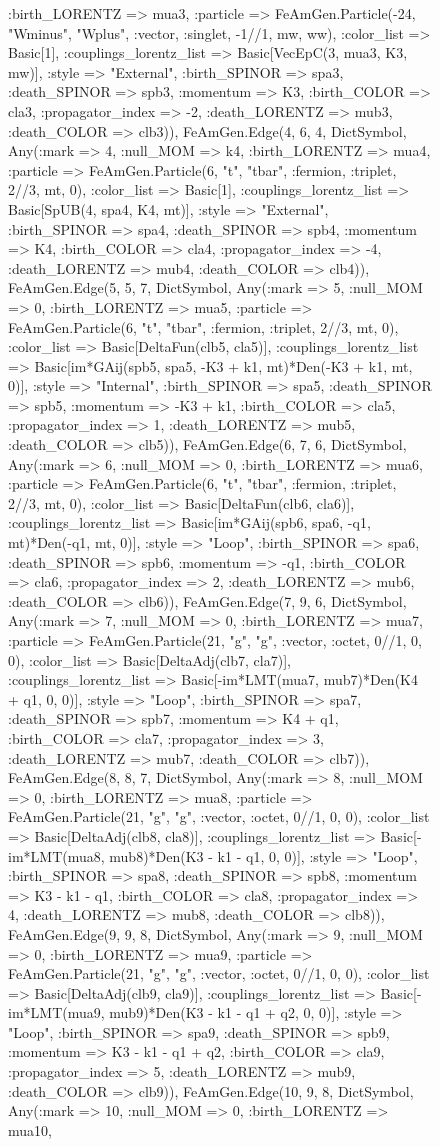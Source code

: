 \documentclass{revtex4}
\begin{document}
\begin{figure}[!htb]
\begin{center}
{:birth_LORENTZ => mua3, :particle => FeAmGen.Particle(-24, "Wminus", "Wplus", :vector, :singlet, -1//1, mw, ww), :color_list => Basic[1], :couplings_lorentz_list => Basic[VecEpC(3, mua3, K3, mw)], :style => "External", :birth_SPINOR => spa3, :death_SPINOR => spb3, :momentum => K3, :birth_COLOR => cla3, :propagator_index => -2, :death_LORENTZ => mub3, :death_COLOR => clb3)), FeAmGen.Edge(4, 6, 4, Dict{Symbol, Any}(:mark => 4, :null_MOM => k4, :birth_LORENTZ => mua4, :particle => FeAmGen.Particle(6, "t", "tbar", :fermion, :triplet, 2//3, mt, 0), :color_list => Basic[1], :couplings_lorentz_list => Basic[SpUB(4, spa4, K4, mt)], :style => "External", :birth_SPINOR => spa4, :death_SPINOR => spb4, :momentum => K4, :birth_COLOR => cla4, :propagator_index => -4, :death_LORENTZ => mub4, :death_COLOR => clb4)), FeAmGen.Edge(5, 5, 7, Dict{Symbol, Any}(:mark => 5, :null_MOM => 0, :birth_LORENTZ => mua5, :particle => FeAmGen.Particle(6, "t", "tbar", :fermion, :triplet, 2//3, mt, 0), :color_list => Basic[DeltaFun(clb5, cla5)], :couplings_lorentz_list => Basic[im*GAij(spb5, spa5, -K3 + k1, mt)*Den(-K3 + k1, mt, 0)], :style => "Internal", :birth_SPINOR => spa5, :death_SPINOR => spb5, :momentum => -K3 + k1, :birth_COLOR => cla5, :propagator_index => 1, :death_LORENTZ => mub5, :death_COLOR => clb5)), FeAmGen.Edge(6, 7, 6, Dict{Symbol, Any}(:mark => 6, :null_MOM => 0, :birth_LORENTZ => mua6, :particle => FeAmGen.Particle(6, "t", "tbar", :fermion, :triplet, 2//3, mt, 0), :color_list => Basic[DeltaFun(clb6, cla6)], :couplings_lorentz_list => Basic[im*GAij(spb6, spa6, -q1, mt)*Den(-q1, mt, 0)], :style => "Loop", :birth_SPINOR => spa6, :death_SPINOR => spb6, :momentum => -q1, :birth_COLOR => cla6, :propagator_index => 2, :death_LORENTZ => mub6, :death_COLOR => clb6)), FeAmGen.Edge(7, 9, 6, Dict{Symbol, Any}(:mark => 7, :null_MOM => 0, :birth_LORENTZ => mua7, :particle => FeAmGen.Particle(21, "g", "g", :vector, :octet, 0//1, 0, 0), :color_list => Basic[DeltaAdj(clb7, cla7)], :couplings_lorentz_list => Basic[-im*LMT(mua7, mub7)*Den(K4 + q1, 0, 0)], :style => "Loop", :birth_SPINOR => spa7, :death_SPINOR => spb7, :momentum => K4 + q1, :birth_COLOR => cla7, :propagator_index => 3, :death_LORENTZ => mub7, :death_COLOR => clb7)), FeAmGen.Edge(8, 8, 7, Dict{Symbol, Any}(:mark => 8, :null_MOM => 0, :birth_LORENTZ => mua8, :particle => FeAmGen.Particle(21, "g", "g", :vector, :octet, 0//1, 0, 0), :color_list => Basic[DeltaAdj(clb8, cla8)], :couplings_lorentz_list => Basic[-im*LMT(mua8, mub8)*Den(K3 - k1 - q1, 0, 0)], :style => "Loop", :birth_SPINOR => spa8, :death_SPINOR => spb8, :momentum => K3 - k1 - q1, :birth_COLOR => cla8, :propagator_index => 4, :death_LORENTZ => mub8, :death_COLOR => clb8)), FeAmGen.Edge(9, 9, 8, Dict{Symbol, Any}(:mark => 9, :null_MOM => 0, :birth_LORENTZ => mua9, :particle => FeAmGen.Particle(21, "g", "g", :vector, :octet, 0//1, 0, 0), :color_list => Basic[DeltaAdj(clb9, cla9)], :couplings_lorentz_list => Basic[-im*LMT(mua9, mub9)*Den(K3 - k1 - q1 + q2, 0, 0)], :style => "Loop", :birth_SPINOR => spa9, :death_SPINOR => spb9, :momentum => K3 - k1 - q1 + q2, :birth_COLOR => cla9, :propagator_index => 5, :death_LORENTZ => mub9, :death_COLOR => clb9)), FeAmGen.Edge(10, 9, 8, Dict{Symbol, Any}(:mark => 10, :null_MOM => 0, :birth_LORENTZ => mua10, }
\end{center}
\end{figure}
\end{document}
